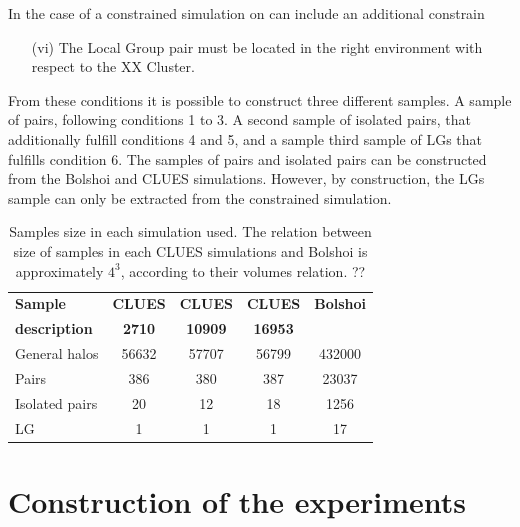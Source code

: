\documentclass[usenatbib]{mn2e}
\begin{document}
In the case of a constrained simulation on can include an additional 
constrain


\begin{enumerate}
\item[(vi)]{The Local Group pair must be located in the right environment 
with respect to the XX Cluster.}
\end{enumerate}


From these conditions it is possible to construct three different samples.
A sample of pairs, following conditions 1 to 3. A second sample of 
isolated pairs, that additionally fulfill conditions 4 and 5, and a sample 
third sample of LGs that fulfills condition 6. The samples of pairs and 
isolated pairs can be constructed from the Bolshoi and CLUES simulations. 
However, by construction, the LGs sample can only be extracted from the 
constrained simulation.


\begin{table}
  \centering
  \begin{tabular}{l | c c c c} \hline
	\textbf{Sample}& \textbf{CLUES} & \textbf{CLUES} & \textbf{CLUES} & \textbf{Bolshoi} \\
	\textbf{description}& \textbf{2710} & \textbf{10909} & \textbf{16953} &  \\ \hline
	General halos 	& 56632 & 57707 & 56799  & 432000 	\\
	Pairs 			& 386 	& 380 	& 387	 & 23037 	\\
	Isolated pairs	& 20 	& 12 	& 18 	 & 1256 	\\
	LG 				& 1 	& 1 	& 1 	 & 17		\\ \hline
  \end{tabular}
  
  \caption{Samples size in each simulation used. The relation between size 
  of samples in each CLUES simulations and Bolshoi is approximately $4^3$, 
  according to their volumes relation. ?? }
  
  \label{Tab:Samples}
\end{table}


\section{Construction of the experiments}
\label{sec:experiments}
\end{document}

